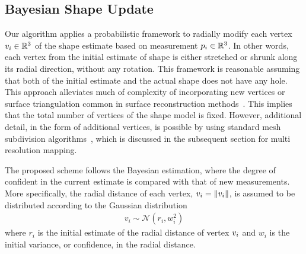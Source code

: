 \documentclass[journal]{new-aiaa}
\begin{document}
\subsection{Bayesian Shape Update}

Our algorithm applies a probabilistic framework to radially modify each vertex \( v_i \in \mathbb{R}^3\) of the shape estimate based on measurement \( p_i \in \mathbb{R}^3 \). 
In other words, each vertex from the initial estimate of shape is either stretched or shrunk along its radial direction, without any rotation. 
This framework is reasonable assuming that both of the initial estimate and the actual shape does not have any hole. 
This approach alleviates much of complexity of incorporating new vertices or surface triangulation common in surface reconstruction methods~\cite{berg2008}.
This implies that the total number of vertices of the shape model is fixed.
However, additional detail, in the form of additional vertices, is possible by using standard mesh subdivision algorithms~\cite{orourke1998}, which is discussed in the subsequent section for multi resolution mapping.

The proposed scheme follows the Bayesian estimation, where the degree of confident in the current estimate is compared with that of new measurements. 
More specifically, the radial distance of each vertex, \( v_i = \left\| v_i \right\|\), is assumed to be distributed according to the Gaussian distribution
\begin{align*}
    v_i \sim \mathcal{N}(r_i, w_i^2)
\end{align*}
where \( r_i \) is the initial estimate of the radial distance of vertex \( v_i\) and \( w_i \) is the initial variance, or confidence, in the radial distance.
\end{document}
